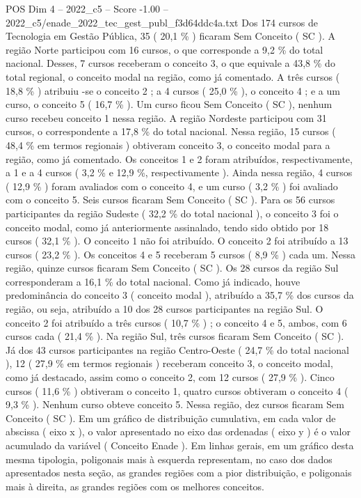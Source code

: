 \begin{textsample}{POS Dim 4 – 2022\_c5 – Score -1.00 – 2022\_c5/enade\_2022\_tec\_gest\_publ\_f3d64ddc4a.txt}
Dos 174 cursos de Tecnologia em Gestão Pública, 35 ( 20,1 \% ) ficaram Sem Conceito ( SC ).
A região Norte participou com 16 cursos, o que corresponde a 9,2 \% do total nacional.
Desses, 7 cursos receberam o conceito 3, o que equivale a 43,8 \% do total regional, o conceito modal na região, como já comentado.
A três cursos ( 18,8 \% ) atribuiu -se o conceito 2 ; a 4 cursos ( 25,0 \% ), o conceito 4 ; e a um curso, o conceito 5 ( 16,7 \% ).
Um curso ficou Sem Conceito ( SC ), nenhum curso recebeu conceito 1 nessa região.
A região Nordeste participou com 31 cursos, o correspondente a 17,8 \% do total nacional.
Nessa região, 15 cursos ( 48,4 \% em termos regionais ) obtiveram conceito 3, o conceito modal para a região, como já comentado.
Os conceitos 1 e 2 foram atribuídos, respectivamente, a 1 e a 4 cursos ( 3,2 \% e 12,9 \%, respectivamente ).
Ainda nessa região, 4 cursos ( 12,9 \% ) foram avaliados com o conceito 4, e um curso ( 3,2 \% ) foi avaliado com o conceito 5.
Seis cursos ficaram Sem Conceito ( SC ).
Para os 56 cursos participantes da região Sudeste ( 32,2 \% do total nacional ), o conceito 3 foi o conceito modal, como já anteriormente assinalado, tendo sido obtido por 18 cursos ( 32,1 \% ).
O conceito 1 não foi atribuído.
O conceito 2 foi atribuído a 13 cursos ( 23,2 \% ).
Os conceitos 4 e 5 receberam 5 cursos ( 8,9 \% ) cada um.
Nessa região, quinze cursos ficaram Sem Conceito ( SC ).
Os 28 cursos da região Sul corresponderam a 16,1 \% do total nacional.
Como já indicado, houve predominância do conceito 3 ( conceito modal ), atribuído a 35,7 \% dos cursos da região, ou seja, atribuído a 10 dos 28 cursos participantes na região Sul.
O conceito 2 foi atribuído a três cursos ( 10,7 \% ) ; o conceito 4 e 5, ambos, com 6 cursos cada ( 21,4 \% ).
Na região Sul, três cursos ficaram Sem Conceito ( SC ).
Já dos 43 cursos participantes na região Centro-Oeste ( 24,7 \% do total nacional ), 12 ( 27,9 \% em termos regionais ) receberam conceito 3, o conceito modal, como já destacado, assim como o conceito 2, com 12 cursos ( 27,9 \% ).
Cinco cursos ( 11,6 \% ) obtiveram o conceito 1, quatro cursos obtiveram o conceito 4 ( 9,3 \% ).
Nenhum curso obteve conceito 5.
Nessa região, dez cursos ficaram Sem Conceito ( SC ).
Em um gráfico de distribuição cumulativa, em cada valor de abscissa ( eixo x ), o valor apresentado no eixo das ordenadas ( eixo y ) é o valor acumulado da variável ( Conceito Enade ).
Em linhas gerais, em um gráfico desta mesma tipologia, poligonais mais à esquerda representam, no caso dos dados apresentados nesta seção, as grandes regiões com a pior distribuição, e poligonais mais à direita, as grandes regiões com os melhores conceitos.

\end{textsample}
